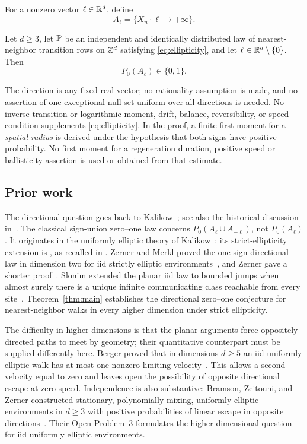 For a nonzero vector $\ell\in\mathbb R^d$, define
\[
 A_\ell=\{X_n\cdot\ell\longrightarrow+\infty\}.
\]
\begin{theorem}\label{thm:main}
Let $d\ge3$, let $\mathbb P$ be an independent and identically distributed
law of nearest-neighbor transition rows on $\mathbb Z^d$ satisfying
\eqref{eq:ellipticity}, and let $\ell\in\mathbb R^d\setminus\{0\}$.
Then
\[
 P_0(A_\ell)\in\{0,1\}.
\]
\end{theorem}

The direction is any fixed real vector; no rationality assumption is
made, and no assertion of one exceptional null set uniform over all
directions is needed. No inverse-transition or logarithmic moment,
drift, balance, reversibility, or speed condition supplements
\eqref{eq:ellipticity}. In the proof, a finite first moment for a
\emph{spatial radius} is derived under the hypothesis that both signs
have positive probability. No first moment for a regeneration duration,
positive speed or ballisticity assertion is used or obtained from that
estimate.

\subsection{Prior work}

The directional question goes back to Kalikow~\cite{Kalikow1981};
see also the historical discussion in~\cite{Zerner2007}.
The classical sign-union zero--one law concerns
$P_0(A_\ell\cup A_{-\ell})$, not $P_0(A_\ell)$.
It originates in the uniformly elliptic theory of
Kalikow~\cite{Kalikow1981}; its strict-ellipticity extension is
\cite[Proposition~3]{ZernerMerkl2001}, as recalled in
\cite[Equation~(1)]{Zerner2007}. Zerner and Merkl proved the
one-sign directional law in dimension two for iid strictly elliptic
environments~\cite[Theorem~1]{ZernerMerkl2001}, and Zerner gave a shorter
proof~\cite{Zerner2007}. Slonim extended the planar iid law to bounded jumps
when almost surely there is a unique infinite communicating class reachable
from every site~\cite[Theorem~2.1]{Slonim2024}. Theorem~\ref{thm:main} establishes
the directional zero--one conjecture for nearest-neighbor walks in every
higher dimension under strict ellipticity.

The difficulty in higher dimensions is that the planar arguments force
oppositely directed paths to meet by geometry; their quantitative
counterpart must be supplied differently here. Berger proved that in
dimensions $d\ge5$ an iid uniformly elliptic walk has at most one nonzero
limiting velocity~\cite[Theorem~1.1]{Berger2008}. This allows a second
velocity equal to zero and leaves open the possibility of opposite
directional escape at zero speed. Independence is also substantive:
Bramson, Zeitouni, and Zerner constructed stationary, polynomially mixing,
uniformly elliptic environments in $d\ge3$ with positive probabilities of
linear escape in opposite directions~\cite[Theorem~3]{BramsonZeitouniZerner2006}.
Their Open Problem~3 formulates the higher-dimensional question for iid
uniformly elliptic environments.

